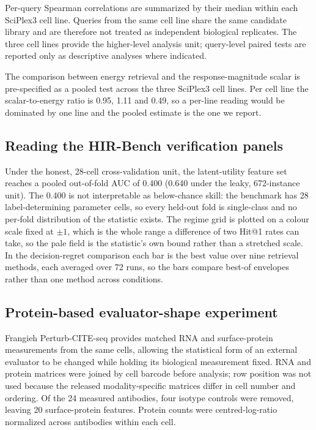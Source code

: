 \documentclass[11pt,letterpaper]{article}
\begin{document}
Per-query Spearman correlations are summarized by their median within each SciPlex3 cell line.
Queries from the same cell line share the same candidate library and are therefore not treated as
independent biological replicates. The three cell lines provide the higher-level analysis unit;
query-level paired tests are reported only as descriptive analyses where indicated.



The comparison between energy retrieval and the response-magnitude scalar is pre-specified as a
pooled test across the three SciPlex3 cell lines. Per cell line the scalar-to-energy ratio is
0.95, 1.11 and 0.49, so a per-line reading would be dominated by one line and the pooled estimate
is the one we report.

\subsection*{Reading the HIR-Bench verification panels}
Under the honest, 28-cell cross-validation unit, the latent-utility feature set reaches a pooled
out-of-fold AUC of 0.400 (0.640 under the leaky, 672-instance unit). The 0.400 is not
interpretable as below-chance skill: the benchmark has 28 label-determining parameter cells, so
every held-out fold is single-class and no per-fold distribution of the statistic exists. The
regime grid is plotted on a colour scale fixed at
$\pm1$, which is the whole range a difference of two Hit@1 rates can take, so the pale field is
the statistic's own bound rather than a stretched scale. In the decision-regret comparison each
bar is the best value over nine retrieval methods, each averaged over 72 runs, so the bars compare
best-of envelopes rather than one method across conditions.

\subsection*{Protein-based evaluator-shape experiment}

Frangieh Perturb-CITE-seq\cite{dataFrangieh} provides matched RNA and surface-protein measurements from the same
cells, allowing the statistical form of an external evaluator to be changed while holding its
biological measurement fixed. RNA and protein matrices were joined by cell barcode before
analysis; row position was not used because the released modality-specific matrices differ in
cell number and ordering. Of the 24 measured antibodies, four isotype controls were removed,
leaving 20 surface-protein features. Protein counts were centred-log-ratio normalized across
antibodies within each cell.
\end{document}
